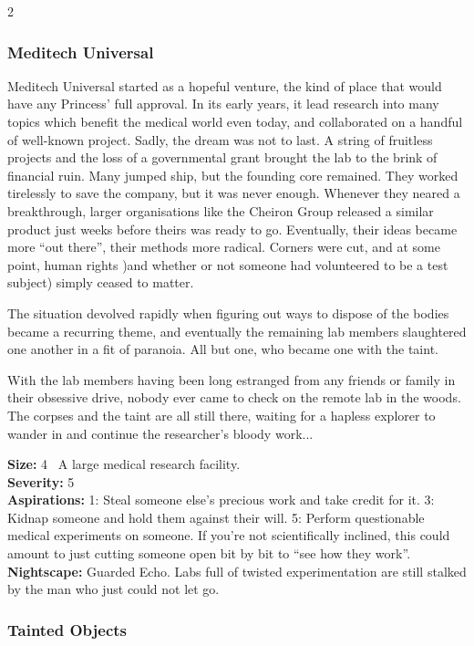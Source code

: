\begin{multicols}{2}
\subsubsection*{Meditech Universal}
Meditech Universal started as a hopeful venture, the kind of place that would have any Princess’ full approval. In its early years, it lead research into many topics which benefit the medical world even today, and collaborated on a handful of well-known project. Sadly, the dream was not to last. A string of fruitless projects and the loss of a governmental grant brought the lab to the brink of financial ruin. Many jumped ship, but the founding core remained. They worked tirelessly to save the company, but it was never enough. Whenever they neared a breakthrough, larger organisations like the Cheiron Group released a similar product just weeks before theirs was ready to go. Eventually, their ideas became more \textquotedblleft out there\textquotedblright, their methods more radical. Corners were cut, and at some point, human rights )and whether or not someone had volunteered to be a test subject) simply ceased to matter.

The situation devolved rapidly when figuring out ways to dispose of the bodies became a recurring theme, and eventually the remaining lab members slaughtered one another in a fit of paranoia. All but one, who became one with the taint.

With the lab members having been long estranged from any friends or family in their obsessive drive, nobody ever came to check on the remote lab in the woods. The corpses and the taint are all still there, waiting for a hapless explorer to wander in and continue the researcher's bloody work...

\textbf{Size:} 4 \textemdash\, A large medical research facility.\\
\textbf{Severity:} 5\\
\textbf{Aspirations:} 1: Steal someone else’s precious work and take credit for it. 3: Kidnap someone and hold them against their will. 5: Perform questionable medical experiments on someone. If you’re not scientifically inclined, this could amount to just cutting someone open bit by bit to “see how they work”.\\
\textbf{Nightscape:} Guarded Echo. Labs full of twisted experimentation are still stalked by the man who just could not let go.

\begin{mybox}

\subsubsection*{Tainted Objects} 


\end{mybox}
\end{multicols}
